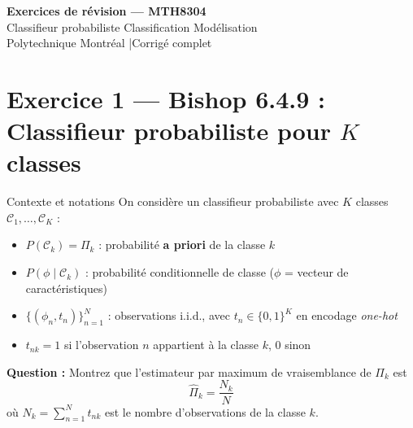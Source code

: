 \documentclass[12pt,a4paper]{article}
\begin{document}
\begin{center}
  {\LARGE\bfseries\color{bleu} Exercices de révision — MTH8304}\\[6pt]
  {\large Classifieur probabiliste \textbullet{} Classification \textbullet{} Modélisation}\\[4pt]
  {\small Polytechnique Montréal \quad|\quad Corrigé complet}
\end{center}

\vspace{8pt}

\section{Exercice 1 — Bishop 6.4.9 : Classifieur probabiliste pour $K$ classes}

\begin{enonce}{Contexte et notations}
On considère un classifieur probabiliste avec $K$ classes $\mathcal{C}_1, \ldots, \mathcal{C}_K$ :
\begin{itemize}[itemsep=2pt]
  \item $P(\mathcal{C}_k) = \Pi_k$ : probabilité \textbf{a priori} de la classe $k$
  \item $P(\phi \mid \mathcal{C}_k)$ : probabilité conditionnelle de classe ($\phi$ = vecteur de caractéristiques)
  \item $\{(\phi_n, t_n)\}_{n=1}^{N}$ : observations i.i.d., avec $t_n \in \{0,1\}^K$ en encodage \emph{one-hot}
  \item $t_{nk} = 1$ si l'observation $n$ appartient à la classe $k$, $0$ sinon
\end{itemize}
\textbf{Question :} Montrez que l'estimateur par maximum de vraisemblance de $\Pi_k$ est
\[
  \hat{\Pi}_k = \frac{N_k}{N}
\]
où $N_k = \sum_{n=1}^{N} t_{nk}$ est le nombre d'observations de la classe $k$.
\end{enonce}
\end{document}
